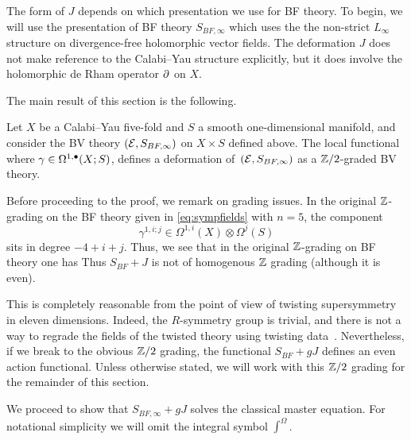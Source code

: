 The form of $J$ depends on which presentation we use for BF theory.
To begin, we will use the presentation of BF theory $S_{BF, \infty}$ which uses the the non-strict $L_\infty$ structure on divergence-free holomorphic vector fields.
The deformation $J$ does not make reference to the Calabi--Yau structure explicitly, but it does involve the holomorphic de Rham operator $\partial$ on $X$. 

The main result of this section is the following. 

\begin{thm}
\label{thm:dfn}
Let $X$ be a Calabi--Yau five-fold and $S$ a smooth one-dimensional manifold, and consider the BV theory $(\mathcal E, S_{BF,\infty})$ on $X \times S$ defined above. The local functional 
  where $\gamma \in \Omega^{1,\bullet}(X;S)$, defines a deformation of~$(\mathcal E,S_{BF,\infty})$ as a $\mathbb{Z}/2$-graded BV theory.
\end{thm}

\parsec[]

Before proceeding to the proof, we remark on grading issues. 
In the original $\mathbb{Z}$-grading on the BF theory given in \eqref{eq:sympfields} with $n=5$, the component 
\[
\gamma^{1,i;j} \in \Omega^{1,i}(X) \otimes \Omega^j(S) 
\]
sits in degree $-4+i+j$. 
Thus, we see that in the original $\mathbb{Z}$-grading on BF theory one has
Thus $S_{BF} + J$ is not of homogenous $\mathbb Z$ grading (although it is even).

This is completely reasonable from the point of view of twisting supersymmetry in eleven dimensions. 
Indeed, the $R$-symmetry group is trivial, and there is not a way to regrade the fields of the twisted theory using twisting data~\label{CosHol,ESW}. 
Nevertheless, if we break to the obvious $\mathbb Z/2$ grading, the functional $S_{BF} + g J$ defines an even action functional.
Unless otherwise stated, we will work with this $\mathbb Z/2$ grading for the remainder of this section.

\parsec[]
We proceed to show that $S_{BF,\infty} + g J$ solves the classical master equation.
For notational simplicity we will omit the integral symbol $\int^\Omega$.

